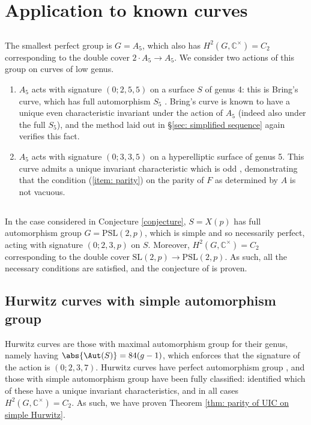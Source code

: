 \documentclass{amsart}
\begin{document}
\section{Application to known curves}

\subsection{}

The smallest perfect group is $G=A_5$, which also has $H^2(G, \mathbb{C}^\times) = C_2$ corresponding to the double cover $2 \cdot A_5 \to A_5$. We consider two actions of this group on curves of low genus. 
\begin{enumerate}
    \item $A_5$ acts with signature $(0; 2, 5, 5)$ on a surface $S$ of genus 4: this is Bring's curve, which has full automorphism $S_5$ \cite{Braden2023a}. Bring's curve is known to have a unique even characteristic invariant under the action of $A_5$ (indeed also under the full $S_5$), and the method laid out in \S\ref{sec: simplified sequence} again verifies this fact.
    \item $A_5$ acts with signature $(0; 3, 3, 5)$ on a hyperelliptic surface of genus 5. This curve admits a unique invariant characteristic which is odd \cite{Braden2025}, demonstrating that the condition (\ref{item: parity}) on the parity of $F$ as determined by $A$ is not vacuous. 
\end{enumerate}

\subsection{}

In the case considered in Conjecture \ref{conjecture}, $S=X(p)$ has full automorphism group $G=\mathrm{PSL}(2, p)$, which is simple and so necessarily perfect, acting with signature $(0; 2, 3, p)$ on $S$. Moreover, $H^2(G, \mathbb{C}^\times)=C_2$ corresponding to the double cover $\mathrm{SL}(2, p) \to \mathrm{PSL}(2, p)$. As such, all the necessary conditions are satisfied, and the conjecture of \cite{Broughton2026} is proven.


\subsection{Hurwitz curves with simple automorphism group}


Hurwitz curves are those with maximal automorphism group for their genus, namely having $\abs{\Aut(S)} = 84(g-1)$, which enforces that the signature of the action is $(0; 2, 3, 7)$. Hurwitz curves have perfect automorphism group \cite{Conder1990}, and those with simple automorphism group have been fully classified: \cite{Braden2025} identified which of these have a unique invariant characteristics, and in all cases $H^2(G, \mathbb{C}^\times) = C_2$. As such, we have proven Theorem \ref{thm: parity of UIC on simple Hurwitz}. 




\end{document}
